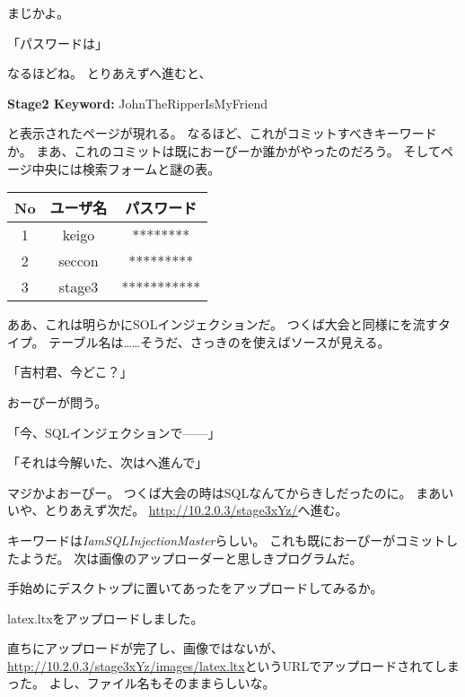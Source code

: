 まじかよ。

「パスワードは」

なるほどね。
とりあえずへ進むと、

\begin{screen}
\centering
\textbf{Stage2 Keyword:} JohnTheRipperIsMyFriend 
\end{screen}

と表示されたページが現れる。
なるほど、これがコミットすべきキーワードか。
まあ、これのコミットは既におーぴーか誰かがやったのだろう。
そしてページ中央には検索フォームと謎の表。

\begin{table}[H]
	\centering
	\begin{tabular}{|c|c|c|}
		\hline
		\textbf{No} & \textbf{ユーザ名} & \textbf{パスワード} \\ \hline
		1 & keigo & ******** \\ \hline
		2 & seccon & ********* \\ \hline
		3 & stage3 & *********** \\ \hline
	\end{tabular}
\end{table}

ああ、これは明らかにSOLインジェクションだ。
つくば大会と同様にを流すタイプ。
テーブル名は……そうだ、さっきのを使えばソースが見える。

「吉村君、今どこ？」

おーぴーが問う。

「今、SQLインジェクションで------」

「それは今解いた、次はへ進んで」

マジかよおーぴー。
つくば大会の時はSQLなんてからきしだったのに。
まあいいや、とりあえず次だ。
\url{http://10.2.0.3/stage3xYz/}へ進む。



キーワードは\textit{IamSQLInjectionMaster}らしい。
これも既におーぴーがコミットしたようだ。
次は画像のアップローダーと思しきプログラムだ。

手始めにデスクトップに置いてあったをアップロードしてみるか。

\begin{screen}
\centering
latex.ltxをアップロードしました。
\end{screen}

直ちにアップロードが完了し、画像ではないが、
\url{http://10.2.0.3/stage3xYz/images/latex.ltx}というURLでアップロードされてしまった。
よし、ファイル名もそのままらしいな。

